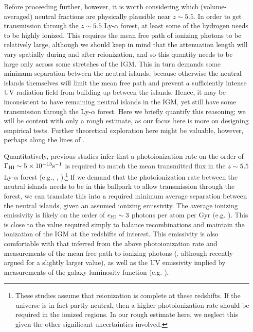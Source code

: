  Before proceeding further, however, it is worth considering which (volume-averaged) neutral fractions are physically plausible near $z \sim 5.5$. In order to get transmission through
 the $z \sim 5.5$ Ly-$\alpha$ forest, at least some of the hydrogen needs to be highly ionized.  This requires the mean free path of ionizing photons to be relatively large, although we should keep in mind that the attenuation length will vary spatially during and after reionization, and so this quantity needs to be large only across some stretches of the IGM.
 This in turn demands some minimum separation between the neutral islands, because otherwise the neutral islands themselves will limit the mean free path and prevent a sufficiently
 intense UV radiation field from building up between the islands. Hence, it may be inconsistent to have remaining neutral islands in the IGM, yet still have some transmission through the Ly-$\alpha$ forest. Here we briefly quantify this reasoning; we will be content with only a rough estimate, as our focus
here is more on designing empirical tests. Further theoretical
exploration here might be valuable, however, perhaps along the lines of \cite{Xu:2013npa}. 

Quantitatively, previous studies infer that a photoionization rate on the order of $\Gamma_{\rm HI} \sim 5 \times 10^{-13} \text{s}^{-1}$ is required to match the mean transmitted flux in the
$z \sim 5.5$ Ly-$\alpha$ forest (e.g., \citealt{KuhlenConcordance}, \citealt{Bolton:2007b}).\footnote{These studies assume that reionization is complete at these redshifts. If the universe is in fact partly neutral, then a higher photoionization rate should be required in the ionized regions. In our rough estimate here, we neglect this given the other significant uncertainties involved.}
If we demand that the photoionization rate between the neutral islands needs to be in this ballpark to allow transmission through the forest, we can translate this into a required minimum average separation
between the neutral islands, given an assumed ionizing emissivity. The average ionizing emissivity is likely on the order of $\epsilon_{\rm HI} \sim 3$ photons per atom per Gyr (e.g. \citealt{Bolton:2007b}).
This is close to the value required simply to balance recombinations and maintain the ionization of the IGM at the redshifts of interest. This emissivity is also comfortable with that inferred from the above
photoionization rate and measurements of the mean free path to ionizing photons (\citealt{Bolton:2007b}, although \citealt{Becker:2013ffa} recently argued for a slightly larger value), as well as the UV emissivity implied by measurements of the galaxy luminosity function (e.g. \citealt{Robertson:2013bq}).
  

